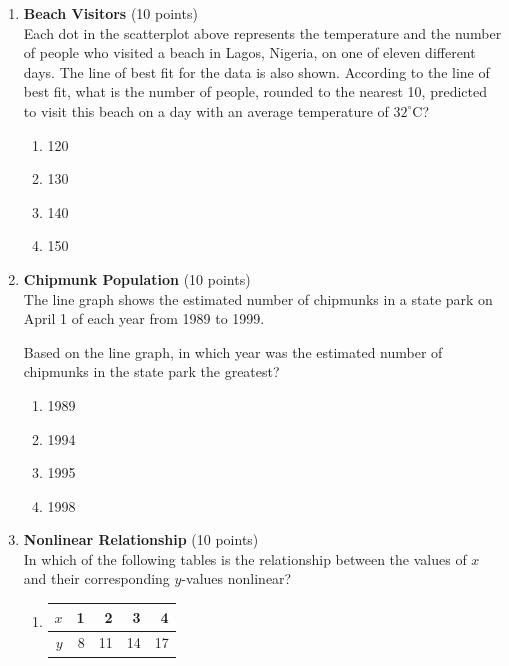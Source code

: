 \begin{enumerate}
  \newpage

  \item \textbf{Beach Visitors} (10 points)\\
  Each dot in the scatterplot above represents the temperature and the number of people who visited a beach in Lagos, Nigeria, on one of eleven different days. The line of best fit for the data is also shown. According to the line of best fit, what is the number of people, rounded to the nearest 10, predicted to visit this beach on a day with an average temperature of $32^{\circ} \mathrm{C}$?
  \begin{enumerate}[label=(\Alph*)]
    \item 120
    \item 130
    \item 140
    \item 150
  \end{enumerate}
  \begin{subanswer}
  \end{subanswer}


  \newpage

  \item \textbf{Chipmunk Population} (10 points)\\
  The line graph shows the estimated number of chipmunks in a state park on April 1 of each year from 1989 to 1999.


  Based on the line graph, in which year was the estimated number of chipmunks in the state park the greatest?
  \begin{enumerate}[label=(\Alph*)]
    \item 1989
    \item 1994
    \item 1995
    \item 1998
  \end{enumerate}
  \begin{subanswer}
  \end{subanswer}

  \item \textbf{Nonlinear Relationship} (10 points)\\
  In which of the following tables is the relationship between the values of $x$ and their corresponding $y$-values nonlinear?
  \begin{enumerate}[label=(\Alph*)]
    \item 
    \begin{center}
    \begin{tabular}{|r|r|r|r|r|}
    \hline
    $x$ & 1 & 2 & 3 & 4 \\
    \hline
    $y$ & 8 & 11 & 14 & 17 \\
    \hline
    \end{tabular}
    \end{center}


\end{enumerate}
\end{enumerate}
